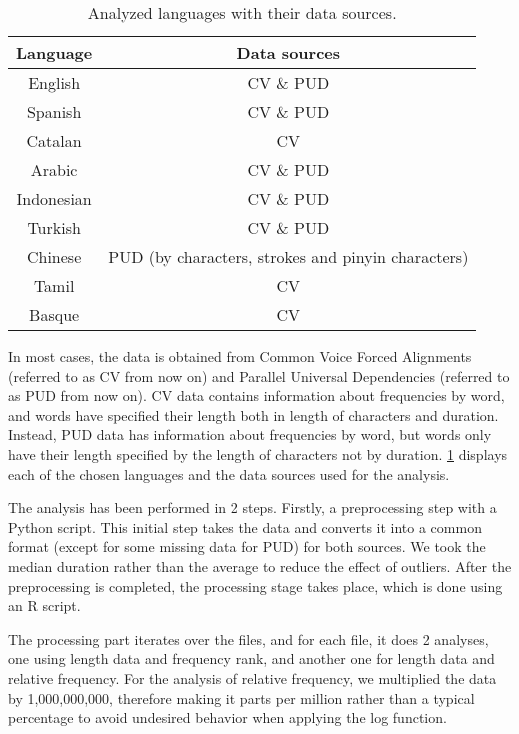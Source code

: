 \begin{table}[h]
    \centering
    \begin{tabular}{c|c}
        Language & Data sources \\ \hline
        English & CV \& PUD \\
        Spanish & CV \& PUD \\
        Catalan & CV \\
        Arabic & CV \& PUD \\
        Indonesian & CV \& PUD \\
        Turkish & CV \& PUD \\
        Chinese & PUD (by characters, strokes and pinyin characters) \\
        Tamil & CV \\
        Basque & CV \\
    \end{tabular}
    \caption{Analyzed languages with their data sources.}
    \label{tab:languagesdata}
\end{table}

In most cases, the data is obtained from Common Voice Forced Alignments\cite{JRMeyer} (referred to as CV from now on) and Parallel Universal Dependencies\cite{UniversalDependencies} (referred to as PUD from now on). CV data contains information about frequencies by word, and words have specified their length both in length of characters and duration. Instead, PUD data has information about frequencies by word, but words only have their length specified by the length of characters not by duration. \cref{tab:languagesdata} displays each of the chosen languages and the data sources used for the analysis. 

The analysis has been performed in 2 steps. Firstly, a preprocessing step with a Python script. This initial step takes the data \cite{IQL-course} and converts it into a common format (except for some missing data for PUD) for both sources. We took the median duration rather than the average to reduce the effect of outliers. After the preprocessing is completed, the processing stage takes place, which is done using an R script.

The processing part iterates over the files, and for each file, it does 2 analyses, one using length data and frequency rank, and another one for length data and relative frequency. For the analysis of relative frequency, we multiplied the data by 1,000,000,000, therefore making it parts per million rather than a typical percentage to avoid undesired behavior when applying the log function.

